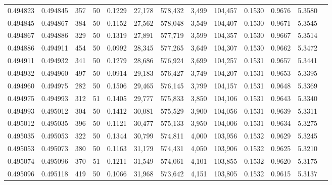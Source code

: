 \begin{tabular}{rrrrrrrrrrrrr}
0.494823 & 0.494845 & 357 &  50 &                                     0.1229 &  27,178 & 578,432 &   3,499 & 104,457 & 0.1530 & 0.9676 & 5.3580 \\
0.494845 & 0.494867 & 384 &  50 &                                     0.1152 &  27,562 & 578,048 &   3,549 & 104,407 & 0.1530 & 0.9671 & 5.3545 \\
0.494867 & 0.494886 & 329 &  50 &                                     0.1319 &  27,891 & 577,719 &   3,599 & 104,357 & 0.1530 & 0.9667 & 5.3514 \\
0.494886 & 0.494911 & 454 &  50 &                                     0.0992 &  28,345 & 577,265 &   3,649 & 104,307 & 0.1530 & 0.9662 & 5.3472 \\
0.494911 & 0.494932 & 341 &  50 &                                     0.1279 &  28,686 & 576,924 &   3,699 & 104,257 & 0.1531 & 0.9657 & 5.3441 \\
0.494932 & 0.494960 & 497 &  50 &                                     0.0914 &  29,183 & 576,427 &   3,749 & 104,207 & 0.1531 & 0.9653 & 5.3395 \\
0.494960 & 0.494975 & 282 &  50 &                                     0.1506 &  29,465 & 576,145 &   3,799 & 104,157 & 0.1531 & 0.9648 & 5.3369 \\
0.494975 & 0.494993 & 312 &  51 &                                     0.1405 &  29,777 & 575,833 &   3,850 & 104,106 & 0.1531 & 0.9643 & 5.3340 \\
0.494993 & 0.495012 & 304 &  50 &                                     0.1412 &  30,081 & 575,529 &   3,900 & 104,056 & 0.1531 & 0.9639 & 5.3311 \\
0.495012 & 0.495035 & 396 &  50 &                                     0.1121 &  30,477 & 575,133 &   3,950 & 104,006 & 0.1531 & 0.9634 & 5.3275 \\
0.495035 & 0.495053 & 322 &  50 &                                     0.1344 &  30,799 & 574,811 &   4,000 & 103,956 & 0.1532 & 0.9629 & 5.3245 \\
0.495053 & 0.495073 & 380 &  50 &                                     0.1163 &  31,179 & 574,431 &   4,050 & 103,906 & 0.1532 & 0.9625 & 5.3210 \\
0.495074 & 0.495096 & 370 &  51 &                                     0.1211 &  31,549 & 574,061 &   4,101 & 103,855 & 0.1532 & 0.9620 & 5.3175 \\
0.495096 & 0.495118 & 419 &  50 &                                     0.1066 &  31,968 & 573,642 &   4,151 & 103,805 & 0.1532 & 0.9615 & 5.3137 \\

\end{tabular}
